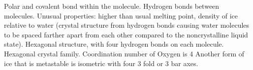 \ddd Polar and covalent bond within the molecule. Hydrogen bonds between molecules.
\ddd Unusual properties: higher than usual melting point, density of ice relative to water (crystal structure from hydrogen bonds causing water molecules to be spaced farther apart from each other compared to the noncrystalline liquid state).
\ddd Hexagonal structure, with four hydrogen bonds on each molecule.
\ddd Hexagonal crystal family. 
\ddd Coordination number of Oxygen is 4
\ddd Another form of ice that is metastable is isometric with four 3 fold or 3 bar axes.  
